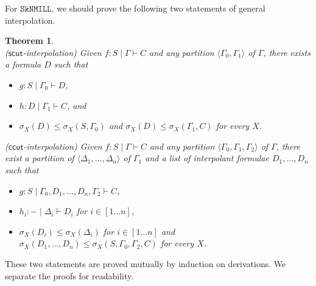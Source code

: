 \documentclass[sn-mathphys-num]{sn-jnl}%
\newcommand{\GG}{\Gamma}
\newcommand{\GD}{\Delta}
\newcommand{\vd}{\vdash}
\newcommand{\SkNMILL}{$\mathtt{SkNMILL}$}
\newcommand{\mf}[1]{\mathsf{#1}}
\newcommand{\gs}[1]{\sigma_{X} (#1)}
\theoremstyle{thmstyleone}%
\newtheorem{theorem}{Theorem}%
\theoremstyle{thmstyletwo}%
\theoremstyle{thmstylethree}%
\begin{document}
For \SkNMILL, we should prove the following two statements of general interpolation.
\begin{theorem}\label{thm:gen:intrp}
~
\\
($\mf{scut}$-interpolation) Given $f: S \mid \Gamma \vd C$ and any partition $\langle \GG_0,\GG_1 \rangle$ of $\GG$, there exists a formula $D$ 
such that
\begin{itemize}
  \item[--] $g : S \mid \GG_0 \vd D$,
  \item[--] $h : D \mid \GG_1 \vd C$, and 
  \item[--] $\gs{D} \leq \gs{S , \GG_0}$ and $\gs{D} \leq \gs{\GG_1 , C}$ for every $X$.
\end{itemize}
  ($\mf{ccut}$-interpolation) Given $f: S \mid \Gamma \vd C$ and any partition $\langle \GG_0,\GG_1, \GG_2 \rangle$ of $\GG$, there exist a partition of $\langle \GD_1, \dots, \GD_n \rangle$ of $\GG_1$ and a list of interpolant formulae $D_1, \dots, D_n$ such that
  \begin{itemize}
    \item[--] $g: S \mid \GG_0, D_1, \dots, D_n, \GG_2 \vd C$,
    \item[--] $h_i : {-} \mid \GD_i \vd D_i$ for $i \in [1\dots n]$,
    \item[--] $\gs{D_i} \leq \gs{\GD_i}$ for $i \in [1 \dots n]$ and $\gs{D_1, \dots, D_n} \leq \gs{S, \GG_0, \GG_2, C}$ for every $X$.
  \end{itemize}
\end{theorem}
These two statements are proved mutually by induction on derivations.
We separate the proofs for readability.
\end{document}
